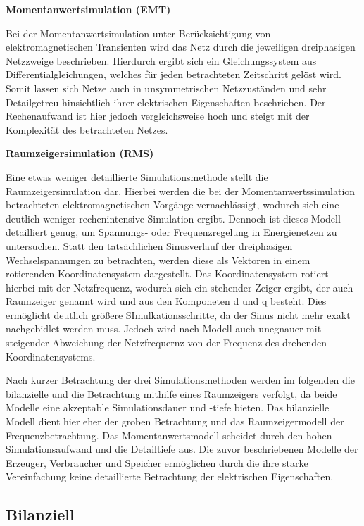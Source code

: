 \textbf{Momentanwertsimulation (EMT)}

Bei der Momentanwertsimulation unter Berücksichtigung von elektromagnetischen Transienten wird das Netz durch die jeweiligen dreiphasigen Netzzweige beschrieben. Hierdurch ergibt sich ein Gleichungssystem aus Differentialgleichungen, welches für jeden betrachteten Zeitschritt gelöst wird. Somit lassen sich Netze auch in unsymmetrischen Netzzuständen und sehr Detailgetreu hinsichtlich ihrer elektrischen Eigenschaften beschrieben. Der Rechenaufwand ist hier jedoch vergleichsweise hoch und steigt mit der Komplexität des betrachteten Netzes. \cite{Simulationsmethoden}

\textbf{Raumzeigersimulation (RMS)}

Eine etwas weniger detaillierte Simulationsmethode stellt die Raumzeigersimulation dar. Hierbei werden die bei der Momentanwertssimulation betrachteten elektromagnetischen Vorgänge vernachlässigt, wodurch sich eine deutlich weniger rechenintensive Simulation ergibt. Dennoch ist dieses Modell detailliert genug, um Spannungs- oder Frequenzregelung in Energienetzen zu untersuchen. Statt den tatsächlichen Sinusverlauf der dreiphasigen Wechselspannungen zu betrachten, werden diese als Vektoren in einem rotierenden Koordinatensystem dargestellt. Das Koordinatensystem rotiert hierbei mit der Netzfrequenz, wodurch sich ein stehender Zeiger ergibt, der auch Raumzeiger genannt wird und aus den Komponeten d und q besteht. Dies ermöglicht deutlich größere SImulkationsschritte, da der Sinus nicht mehr exakt nachgebidlet werden muss. Jedoch wird nach Modell auch unegnauer mit steigender Abweichung der Netzfrequernz von der Frequenz des drehenden Koordinatensystems. \cite{Simulationsmethoden}

Nach kurzer Betrachtung der drei Simulationsmethoden werden im folgenden die bilanzielle und die Betrachtung mithilfe eines Raumzeigers verfolgt, da beide Modelle eine akzeptable Simulationsdauer und -tiefe bieten. Das bilanzielle Modell dient hier eher der groben Betrachtung und das Raumzeigermodell der Frequenzbetrachtung. Das Momentanwertsmodell scheidet durch den hohen Simulationsaufwand und die Detailtiefe aus. Die zuvor beschriebenen Modelle der Erzeuger, Verbraucher und Speicher ermöglichen durch die ihre starke Vereinfachung keine detaillierte Betrachtung der elektrischen Eigenschaften.

\subsection{Bilanziell}

